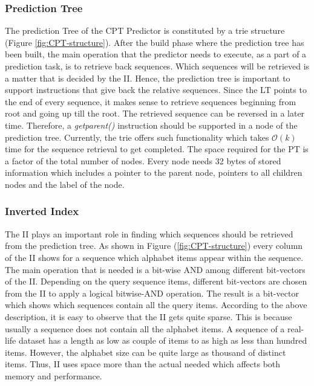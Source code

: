 \subsubsection*{Prediction Tree}
The prediction Tree of the CPT Predictor is constituted by a trie structure (Figure \ref{fig:CPT-structure}). After the build phase where the prediction tree has been built, the main operation that the predictor needs to execute, as a part of a prediction task, is to retrieve back sequences. Which sequences will be retrieved is a matter that is decided by the II. Hence, the prediction tree is important to support instructions that give back the relative sequences. Since the LT points to the end of every sequence, it makes sense to retrieve sequences beginning from root and going up till the root. The retrieved sequence can be reversed in a later time. Therefore, a \emph{getparent()} instruction should be supported in a node of the prediction tree. Currently, the trie offers such functionality which takes \(\mathcal{O}(k)\) time for the sequence retrieval to get completed. The space required for the PT is a factor of the total number of nodes. Every node needs 32 bytes of stored information which includes a pointer to the parent node, pointers to all children nodes and the label of the node.

\subsubsection*{Inverted Index}
The II plays an important role in finding which sequences should be retrieved from the prediction tree. As shown in Figure (\ref{fig:CPT-structure}) every column of the II shows for a sequence which alphabet items appear within the sequence. The main operation that is needed is a bit-wise AND among different bit-vectors of the II. Depending on the query sequence items, different bit-vectors are chosen from the II to apply a logical bitwise-AND operation. The result is a bit-vector which shows which sequences contain all the query items. According to the above description, it is easy to observe that the II gets quite sparse. This is because usually a sequence does not contain all the alphabet items. A sequence of a real-life dataset has a length as low as couple of items to as high as less than hundred items. However, the alphabet size can be quite large as thousand of distinct items. Thus, II uses space more than the actual needed which affects both memory and performance.

